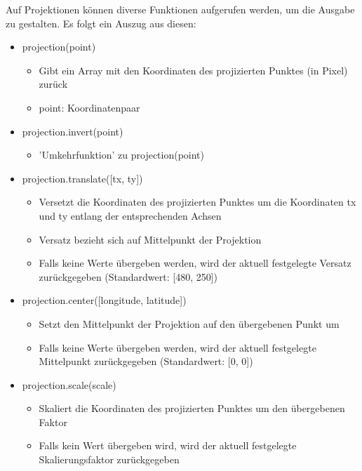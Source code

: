 Auf Projektionen können diverse Funktionen aufgerufen werden, um die Ausgabe zu gestalten. Es folgt ein Auszug aus diesen:

\begin{itemize}
    \item projection(point)
            \begin{itemize}
                \item Gibt ein Array mit den Koordinaten des projizierten Punktes (in Pixel) zurück
                \item point: Koordinatenpaar
            \end{itemize}
    \item projection.invert(point)
            \begin{itemize}
                \item 'Umkehrfunktion' zu projection(point)
            \end{itemize}
    \item projection.translate([tx, ty])
            \begin{itemize}
                \item Versetzt die Koordinaten des projizierten Punktes um die Koordinaten tx und ty entlang der entsprechenden Achsen
                \item Versatz bezieht sich auf Mittelpunkt der Projektion
                \item Falls keine Werte übergeben werden, wird der aktuell festgelegte Versatz zurückgegeben (Standardwert: [480, 250])
            \end{itemize}
    \item projection.center([longitude, latitude])
            \begin{itemize}
                \item Setzt den Mittelpunkt der Projektion auf den übergebenen Punkt um
                \item Falls keine Werte übergeben werden, wird der aktuell festgelegte Mittelpunkt zurückgegeben (Standardwert: [0, 0])
            \end{itemize}
    \item projection.scale(scale)
            \begin{itemize}
                \item Skaliert die Koordinaten des projizierten Punktes um den übergebenen Faktor
                \item Falls kein Wert übergeben wird, wird der aktuell festgelegte Skalierungsfaktor zurückgegeben
            \end{itemize}
\end{itemize}

